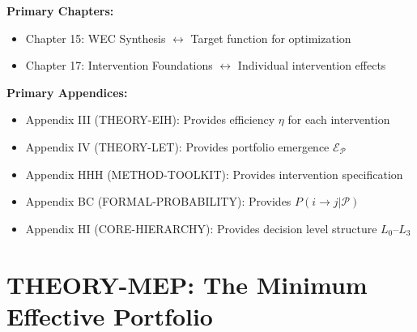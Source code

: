\begin{tcolorbox}[colback=purple!5!white, colframe=purple!75!black,
    title=Chapter Linkage]

\textbf{Primary Chapters:}
\begin{itemize}[nosep]
\item Chapter 15: WEC Synthesis $\leftrightarrow$ Target function for optimization
\item Chapter 17: Intervention Foundations $\leftrightarrow$ Individual intervention effects
\end{itemize}

\textbf{Primary Appendices:}
\begin{itemize}[nosep]
\item Appendix III (THEORY-EIH): Provides efficiency $\eta$ for each intervention
\item Appendix IV (THEORY-LET): Provides portfolio emergence $\mathcal{E}_{\mathcal{P}}$
\item Appendix HHH (METHOD-TOOLKIT): Provides intervention specification
\item Appendix BC (FORMAL-PROBABILITY): Provides $P(i \to j | \mathcal{P})$
\item Appendix HI (CORE-HIERARCHY): Provides decision level structure $L_0$--$L_3$
\end{itemize}

\end{tcolorbox}


\chapter{THEORY-MEP: The Minimum Effective Portfolio}
\label{app:theory-mep}


\begin{abstract}
How many interventions at which decision levels are needed to change behavior?
This appendix answers this question by formalizing the \textbf{Minimum Effective
Portfolio (MEP)} problem---the behavioral analogue to Markowitz's Minimum Variance
Portfolio in finance. We prove that optimal intervention portfolios minimize cost
subject to a minimum effectiveness constraint, where effectiveness depends on
individual intervention effects, their efficiency (EIH), and portfolio emergence
(LET). The key insight: while financial portfolios benefit from low covariance
(diversification), behavioral portfolios benefit from high complementarity
(synergy). We derive the Behavioral Efficient Frontier and provide analytical
solutions for special cases.
\end{abstract}

